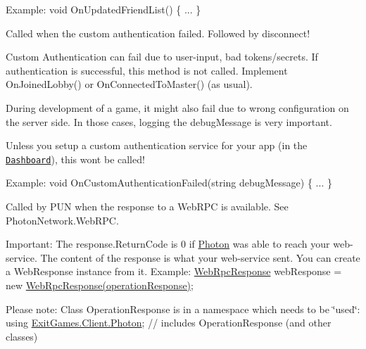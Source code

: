 \begin{Desc}
\begin{description}
Example\+: void On\+Updated\+Friend\+List() \{ ... \} \item[{\em 
On\+Custom\+Authentication\+Failed\hypertarget{group__public_api_ggaf30bbea51cc8c4b1ddc239d1c5c1468fa03351bfa4fb9325a5b0486862d4be3be}{}\label{group__public_api_ggaf30bbea51cc8c4b1ddc239d1c5c1468fa03351bfa4fb9325a5b0486862d4be3be}
}]Called when the custom authentication failed. Followed by disconnect! 

Custom Authentication can fail due to user-\/input, bad tokens/secrets. If authentication is successful, this method is not called. Implement On\+Joined\+Lobby() or On\+Connected\+To\+Master() (as usual).

During development of a game, it might also fail due to wrong configuration on the server side. In those cases, logging the debug\+Message is very important.

Unless you setup a custom authentication service for your app (in the \href{https://www.exitgames.com/dashboard}{\tt Dashboard}), this won\textquotesingle{}t be called!

Example\+: void On\+Custom\+Authentication\+Failed(string debug\+Message) \{ ... \} \item[{\em 
On\+Web\+Rpc\+Response\hypertarget{group__public_api_ggaf30bbea51cc8c4b1ddc239d1c5c1468faa98a8b15d4aa12e02e5ccbc98172eecc}{}\label{group__public_api_ggaf30bbea51cc8c4b1ddc239d1c5c1468faa98a8b15d4aa12e02e5ccbc98172eecc}
}]Called by P\+UN when the response to a Web\+R\+PC is available. See Photon\+Network.\+Web\+R\+PC. 

Important\+: The response.\+Return\+Code is 0 if \hyperlink{namespace_photon}{Photon} was able to reach your web-\/service. The content of the response is what your web-\/service sent. You can create a Web\+Response instance from it. Example\+: \hyperlink{class_web_rpc_response}{Web\+Rpc\+Response} web\+Response = new \hyperlink{class_web_rpc_response}{Web\+Rpc\+Response(operation\+Response)};

Please note\+: Class Operation\+Response is in a namespace which needs to be \char`\"{}used\char`\"{}\+: using \hyperlink{namespace_exit_games_1_1_client_1_1_photon}{Exit\+Games.\+Client.\+Photon}; // includes Operation\+Response (and other classes)


\end{description}
\end{Desc}
